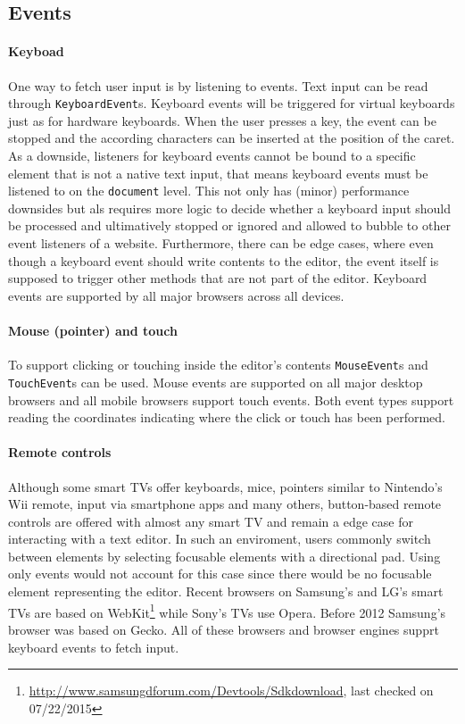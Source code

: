 \subsection{Events} 

\paragraph{Keyboad} One way to fetch user input is by listening to events. Text input can be read through \texttt{KeyboardEvent}s. Keyboard events will be triggered for virtual keyboards just as for hardware keyboards. When the user presses a key, the event can be stopped and the according characters can be inserted at the position of the caret. As a downside, listeners for keyboard events cannot be bound to a specific element that is not a native text input, that means keyboard events must be listened to on the \texttt{document} level. This not only has (minor) performance downsides but als requires more logic to decide whether a keyboard input should be processed and ultimatively stopped or ignored and allowed to bubble to other event listeners of a website. Furthermore, there can be edge cases, where even though a keyboard event should write contents to the editor, the event itself is supposed to trigger other methods that are not part of the editor. Keyboard events are supported by all major browsers across all devices.

\paragraph{Mouse (pointer) and touch} To support clicking or touching inside the editor's contents \texttt{MouseEvent}s and \texttt{TouchEvent}s can be used. Mouse events are supported on all major desktop browsers and all mobile browsers support touch events. Both event types support reading the coordinates indicating where the click or touch has been performed.

\paragraph{Remote controls} Although some smart TVs offer keyboards, mice, pointers similar to Nintendo's Wii remote, input via smartphone apps and many others, button-based remote controls are offered with almost any smart TV and remain a edge case for interacting with a text editor. In such an enviroment, users commonly switch between elements by selecting focusable elements with a directional pad. Using only events would not account for this case since there would be no focusable element representing the editor. Recent browsers on Samsung's and LG's smart TVs are based on WebKit\footnote{\url{http://www.samsungdforum.com/Devtools/Sdkdownload}, last checked on 07/22/2015} while Sony's TVs use Opera. Before 2012 Samsung's browser was based on Gecko. All of these browsers and browser engines supprt keyboard events to fetch input.

